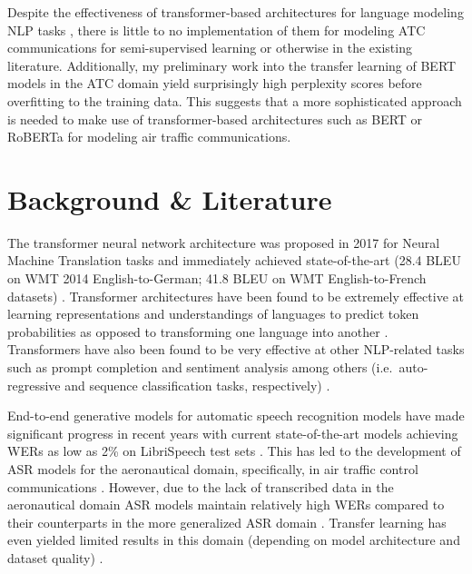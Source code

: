 \documentclass[10pt]{article}
\begin{document}
        Despite the effectiveness of transformer-based architectures for language modeling NLP tasks
        \cite{devlin_bert_2019,lewis_bart_2019,liu_roberta_2019}, there is little to no implementation
        of them for modeling ATC communications for semi-supervised learning or otherwise in the
        existing literature.
        Additionally, my preliminary work into the transfer learning of BERT models in the ATC
        domain yield surprisingly high perplexity scores before overfitting to the training data.
        This suggests that a more sophisticated approach is needed to make use of transformer-based
        architectures such as BERT or RoBERTa for modeling air traffic communications.

    \section{Background \& Literature}
        The transformer neural network architecture was proposed in 2017 for Neural Machine Translation tasks and immediately achieved
        state-of-the-art (28.4 BLEU on WMT 2014 English-to-German; 41.8 BLEU on WMT English-to-French datasets)
        \cite{vaswani_attention_2017}. Transformer architectures have been found to be extremely effective at learning representations
        and understandings of languages to predict token probabilities as opposed to transforming one language into another
        \cite{devlin_bert_2019,liu_roberta_2019}. Transformers have also been found to be very effective at
        other NLP-related tasks such as prompt completion and sentiment analysis among others (i.e.~auto-regressive and sequence
        classification tasks, respectively) \cite{lewis_bart_2019,radford_improving_2018}.


        End-to-end generative models for automatic speech recognition models have made significant progress in recent years with
        current state-of-the-art models achieving WERs as low as 2\% on LibriSpeech test sets
        \cite{han_contextnet_2020,kriman_quartznet_2020,baevski_wav2vec_2020,li_jasper_2019}. This has led to the development of ASR
        models for the aeronautical domain, specifically, in air traffic control communications
        \cite{badrinath_automatic_2022,smidl_air_2019,zuluaga-gomez_automatic_2020,srinivasamurthy_semi-supervised_2017}.
        However, due to the lack of transcribed data in the aeronautical domain
        \cite{zuluaga-gomez_automatic_2020,srinivasamurthy_semi-supervised_2017,badrinath_automatic_2022,smidl_air_2019}
        ASR models maintain relatively high WERs compared to their counterparts in the more generalized ASR domain
        \cite{zuluaga-gomez_automatic_2020,badrinath_automatic_2022}. Transfer learning has even yielded limited results
        in this domain (depending on model architecture and dataset quality)
        \cite{badrinath_automatic_2022,zuluaga-gomez_automatic_2020}.
\end{document}
